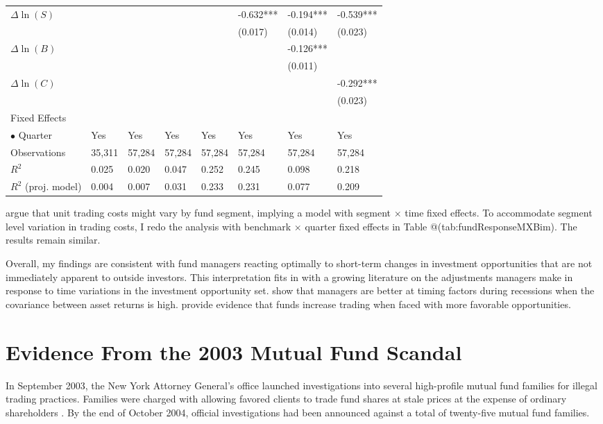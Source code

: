 \documentclass[openany]{book}
\theoremstyle{definition}
\theoremstyle{definition}
\theoremstyle{definition}
\theoremstyle{remark}
\begin{document}
\begin{table}[ht]
\begin{tabularx}{0.975\textwidth}{lYYYYYYY}
  $\Delta\ln(S)$ &  &  &  &  & -0.632*** & -0.194*** & -0.539*** \\ 
   &  &  &  &  & (0.017) & (0.014) & (0.023) \\ 
  $\Delta\ln(B)$ &  &  &  &  &  & -0.126*** &  \\ 
   &  &  &  &  &  & (0.011) &  \\ 
  $\Delta\ln(C)$ &  &  &  &  &  &  & -0.292*** \\ 
   &  &  &  &  &  &  & (0.023) \\ 
  Fixed Effects &  &  &  &  &  &  &  \\ 
  $\bullet$ Quarter & Yes & Yes & Yes & Yes & Yes & Yes & Yes \\ 
  Observations & 35,311 & 57,284 & 57,284 & 57,284 & 57,284 & 57,284 & 57,284 \\ 
  $R^2$ & 0.025 & 0.020 & 0.047 & 0.252 & 0.245 & 0.098 & 0.218 \\ 
  $R^2$ (proj. model) & 0.004 & 0.007 & 0.031 & 0.233 & 0.231 & 0.077 & 0.209 \\ 
   \bottomrule
\end{tabularx}
\endgroup
\end{table}

\citet{pst17L} argue that unit trading costs might vary by fund segment,
implying a model with segment \(\times\) time fixed effects. To
accommodate segment level variation in trading costs, I redo the
analysis with benchmark \(\times\) quarter fixed effects in Table
@(tab:fundResponseMXBim). The results remain similar.

Overall, my findings are consistent with fund managers reacting
optimally to short-term changes in investment opportunities that are not
immediately apparent to outside investors. This interpretation fits in
with a growing literature on the adjustments managers make in response
to time variations in the investment opportunity set. \citet{knv16} show
that managers are better at timing factors during recessions when the
covariance between asset returns is high. \citet{pst17} provide evidence
that funds increase trading when faced with more favorable
opportunities.

\hypertarget{sec:scandal}{%
\chapter{Evidence From the 2003 Mutual Fund Scandal}\label{sec:scandal}}

In September 2003, the New York Attorney General's office launched
investigations into several high-profile mutual fund families for
illegal trading practices. Families were charged with allowing favored
clients to trade fund shares at stale prices at the expense of ordinary
shareholders \citep{hw05, zitzewitz06}. By the end of October 2004,
official investigations had been announced against a total of
twenty-five mutual fund families.
\end{document}
